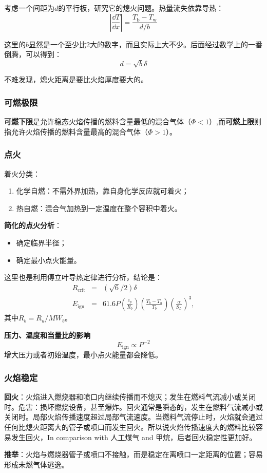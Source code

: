 考虑一个间距为\(d\)的平行板，研究它的熄火问题。热量流失依靠导热：
\begin{equation}
    \left|\frac{\dd T}{\dd x}\right| = \frac{T_\mathrm{b} - T_\mathrm{w}}{d/b}
\end{equation}

这里的\(b\)显然是一个至少比2大的数字，而且实际上大不少。后面经过数学上的一番倒腾，可以得到：
\begin{equation}
    d = \sqrt{b}\delta
\end{equation}

不难发现，熄火距离是要比火焰厚度要大的。

\subsubsection{可燃极限}

\textbf{可燃下限}是允许稳态火焰传播的燃料含量最低的混合气体（\(\Phi<1\)）,而\textbf{可燃上限}则指允许火焰传播的燃料含量最高的混合气体（\(\Phi>1\)）。

\subsubsection{点火}

着火分类：
\begin{enumerate}
    \item 化学自燃：不需外界加热，靠自身化学反应就可着火；
    \item 热自燃：混合气加热到一定温度在整个容积中着火。
\end{enumerate}

\textbf{简化的点火分析}：
\begin{itemize}
    \item 确定临界半径；
    \item 确定最小点火能量。
\end{itemize}

这里也是利用傅立叶导热定律进行分析，结论是：
\begin{eqnarray}
    R_\mathrm{crit}&=& (\sqrt{6}/2)\delta\\
    E_{\mathrm{ign}}&=&61.6P\left(\frac{c_{p}}{R_{b}}\right)\left(\frac{T_{b}-T_{u}}{T_{b}}\right)\left(\frac{\alpha}{S_{L}}\right)^{3},
\end{eqnarray}其中\(R_b = R_u/MW_b\)。

\textbf{压力、温度和当量比的影响}
\begin{equation}
    E_\mathrm{ign}\propto P^{-2}
\end{equation}
增大压力或者初始温度，最小点火能量都会降低。

\subsubsection{火焰稳定}
\textbf{回火}：火焰进入燃烧器和喷口内继续传播而不熄灭；发生在燃料气流减小或关闭时。危害：损坏燃烧设备，甚至爆炸。回火通常是瞬态的，发生在燃料气流减小或关闭时。局部火焰传播速度超过局部气流速度。当燃料气流停止时，火焰就会通过任何比熄火距离大的管子或喷口而发生回火。所以说火焰传播速度大的燃料比较容易发生回火，In comparison with 人工煤气 and 甲烷，后者回火稳定性更加好。

\textbf{推举}：火焰与燃烧器管子或喷口不接触，而是稳定在离喷口一定距离的位置；容易形成未燃气体逃逸。
